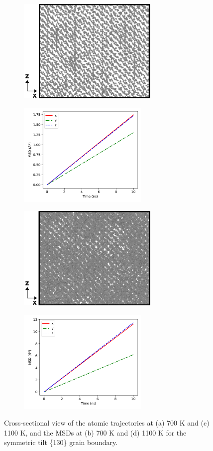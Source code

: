 \documentclass{elsarticle}
\begin{document}
\begin{figure}[!ht]
\centering
	\begin{subfigure}{0.49\textwidth}
		\centering
		\caption{}
		\includegraphics[height=5cm]{130at700cs.png}
	\end{subfigure}
	\begin{subfigure}{0.49\textwidth}
		\centering
		\caption{}
		\includegraphics[height=5cm]{130at700xyz.pdf}
	\end{subfigure}
    \par\medskip
	\begin{subfigure}{0.49\textwidth}
		\centering
		\caption{}
		\includegraphics[height=5cm]{130at1100cs.png}
	\end{subfigure}
	\begin{subfigure}{0.49\textwidth}
		\centering
		\caption{}
		\includegraphics[height=5cm]{130at1100xyz.pdf}
	\end{subfigure}
\caption{Cross-sectional view of the atomic trajectories at (a) 700 K and (c) 1100 K, and the MSDs at (b) 700 K and (d) 1100 K for the symmetric tilt \{130\} grain boundary.}
\label{fig:130}
\end{figure}
\end{document}
